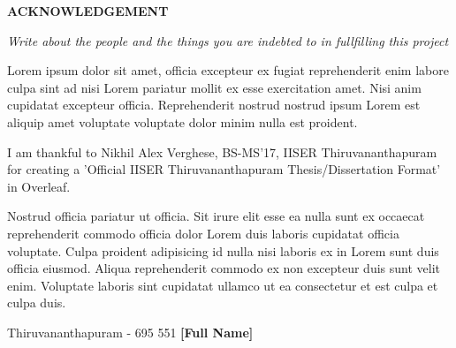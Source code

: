 \begin{center}
  {\Large{\bf{ACKNOWLEDGEMENT}}}
\end{center}

\vspace{2em}

\textit{Write about the people and the things you are indebted to in fullfilling this project}

Lorem ipsum dolor sit amet, officia excepteur ex fugiat reprehenderit enim labore culpa sint ad nisi Lorem pariatur mollit ex esse exercitation amet. Nisi anim cupidatat excepteur officia. Reprehenderit nostrud nostrud ipsum Lorem est aliquip amet voluptate voluptate dolor minim nulla est proident. 

I am thankful to Nikhil Alex Verghese, BS-MS'17, IISER Thiruvananthapuram for creating a 'Official IISER Thiruvananthapuram Thesis/Dissertation Format' in Overleaf.

Nostrud officia pariatur ut officia. Sit irure elit esse ea nulla sunt ex occaecat reprehenderit commodo officia dolor Lorem duis laboris cupidatat officia voluptate. Culpa proident adipisicing id nulla nisi laboris ex in Lorem sunt duis officia eiusmod. Aliqua reprehenderit commodo ex non excepteur duis sunt velit enim. Voluptate laboris sint cupidatat ullamco ut ea consectetur et est culpa et culpa duis.

\vspace{3em}

\noindent Thiruvananthapuram - 695 551 \hfill \textbf{[Full Name]}
